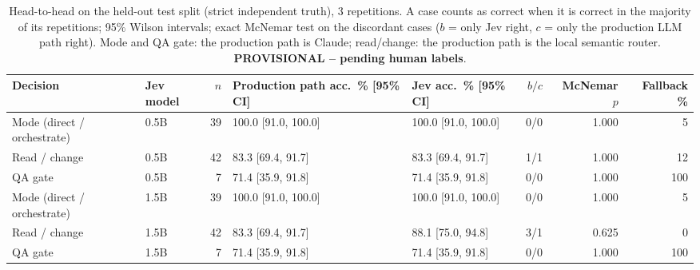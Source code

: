 \begin{table}[t]\centering\scriptsize
\caption{Head-to-head on the held-out test split (strict independent truth), 3 repetitions. A case counts as correct when it is correct in the majority of its repetitions; 95\% Wilson intervals; exact McNemar test on the discordant cases ($b$ = only Jev right, $c$ = only the production LLM path right). Mode and QA gate: the production path is Claude; read/change: the production path is the local semantic router. \textbf{PROVISIONAL -- pending human labels}.}
\label{tab:h2h}
\begin{tabular}{l l r l l r r r}\toprule
Decision & Jev model & $n$ & Production path acc.\ \% [95\% CI] & Jev acc.\ \% [95\% CI] & $b/c$ & McNemar $p$ & Fallback \%\\\midrule
Mode (direct / orchestrate) & 0.5B & 39 & 100.0 [91.0, 100.0] & 100.0 [91.0, 100.0] & 0/0 & 1.000 & 5 \\
Read / change & 0.5B & 42 & 83.3 [69.4, 91.7] & 83.3 [69.4, 91.7] & 1/1 & 1.000 & 12 \\
QA gate & 0.5B & 7 & 71.4 [35.9, 91.8] & 71.4 [35.9, 91.8] & 0/0 & 1.000 & 100 \\
Mode (direct / orchestrate) & 1.5B & 39 & 100.0 [91.0, 100.0] & 100.0 [91.0, 100.0] & 0/0 & 1.000 & 5 \\
Read / change & 1.5B & 42 & 83.3 [69.4, 91.7] & 88.1 [75.0, 94.8] & 3/1 & 0.625 & 0 \\
QA gate & 1.5B & 7 & 71.4 [35.9, 91.8] & 71.4 [35.9, 91.8] & 0/0 & 1.000 & 100 \\
\bottomrule\end{tabular}\end{table}
